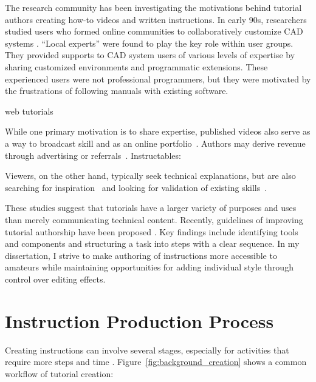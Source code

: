 The research community has been investigating the motivations behind tutorial authors creating how-to videos and written instructions.
%
In early 90s, researchers studied users who formed online communities to collaboratively customize CAD systems \cite{Gantt:1992:GGP:142750.142767}. ``Local experts'' were found to play the key role within user groups. They provided supports to CAD system users of various levels of expertise by sharing customized environments and programmatic extensions. These experienced users were not professional programmers, but they were motivated by the frustrations of following manuals with existing software.

web tutorials \cite{BenLafreniere:2013ux}

While one primary motivation is to share expertise, published videos also serve as a way to broadcast skill and as an online portfolio~\cite{Torrey:2007he,Kuznetsov:2010:REA:1868914.1868950}.
%
Authors may derive revenue through advertising or referrals~\cite{Lafreniere:2012tl}.
Instructables: \cite{Tseng:2014:PVP:2598510.2598540}

Viewers, on the other hand, typically seek technical explanations, but are also searching for inspiration~\cite{Torrey:2009fc} and looking for validation of existing skills~\cite{Lafreniere:2012tl}.

These studies suggest that tutorials have a larger variety of purposes and uses than merely communicating technical content. Recently, guidelines of improving tutorial authorship have been proposed \cite{Wakkary:2015:TAH:2702123.2702550}. Key findings include identifying tools and components and structuring a task into steps with a clear sequence.
%
In my dissertation, I strive to make authoring of instructions more accessible to amateurs while maintaining opportunities for adding individual style through control over editing effects.


\section{Instruction Production Process}
\label{background_creation}

Creating instructions can involve several stages, especially for activities that require more steps and time .
%
Figure~\ref{fig:background_creation} shows a common workflow of tutorial creation:

